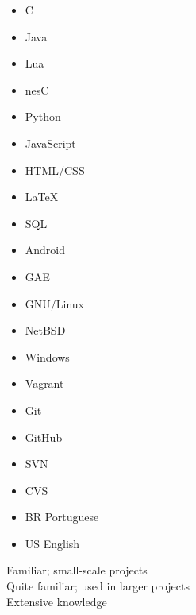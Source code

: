 \documentclass[a4paper,10pt]{article}
\begin{document}
\begin{multicols}{3}
  \begin{itemize}
    \renewcommand{\labelitemi}{\textcolor{lightg}{\symbol{"00BB}}}
    \setlength{\itemsep}{1pt}
    \setlength{\parskip}{0pt}
    \setlength{\parsep}{0pt}
  \item C \hfill \threenotes 
  \item Java \hfill \twonotes
  \item Lua \hfill \threenotes
  \item nesC \hfill \onenote
  \item Python \hfill \twonotes
  \item JavaScript \hfill \twonotes
  \item HTML/CSS \hfill \twonotes
  \item \LaTeX \hfill \onenote
  \item SQL \hfill \twonotes
  \item Android \hfill \twonotes
  \item GAE \hfill \twonotes
  \item GNU/Linux \hfill \threenotes
  \item NetBSD \hfill \twonotes
  \item Windows \hfill \onenote
  \item Vagrant \hfill \twonotes
  \item Git \hfill \twonotes
  \item GitHub \hfill \twonotes
  \item SVN \hfill \onenote
  \item CVS \hfill \onenote
  \item BR Portuguese \hfill \twonotes
  \item US English \hfill \twonotes
  \end{itemize} 
\end{multicols}

\vspace{1em}

\begin{center}
\parbox[c]{8cm}{
  \onenote Familiar; small-scale projects \\
  \twonotes Quite familiar; used in larger projects \\
  \threenotes Extensive knowledge
}
\end{center}
\end{document}
